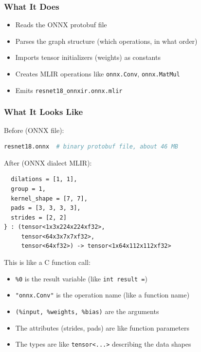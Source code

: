 \documentclass[12pt,a4paper]{article}
\begin{document}
\subsubsection{What It Does}
\begin{itemize}
  \item Reads the ONNX protobuf file
  \item Parses the graph structure (which operations, in what order)
  \item Imports tensor initializers (weights) as constants
  \item Creates MLIR operations like \texttt{onnx.Conv}, \texttt{onnx.MatMul}
  \item Emits \texttt{resnet18\_onnxir.onnx.mlir}
\end{itemize}

\subsubsection{What It Looks Like}
Before (ONNX file):
\begin{lstlisting}[language=bash]
resnet18.onnx  # binary protobuf file, about 46 MB
\end{lstlisting}

After (ONNX dialect MLIR):
\begin{lstlisting}[caption=Stage 1 Output Example]
%0 = "onnx.Conv"(%input, %weights, %bias) {
  dilations = [1, 1],
  group = 1,
  kernel_shape = [7, 7],
  pads = [3, 3, 3, 3],
  strides = [2, 2]
} : (tensor<1x3x224x224xf32>,
     tensor<64x3x7x7xf32>,
     tensor<64xf32>) -> tensor<1x64x112x112xf32>
\end{lstlisting}

\begin{analogyenv}
This is like a C function call:
\begin{itemize}
  \item \texttt{\%0} is the result variable (like \texttt{int result =})
  \item \texttt{"onnx.Conv"} is the operation name (like a function name)
  \item \texttt{(\%input, \%weights, \%bias)} are the arguments
  \item The attributes (strides, pads) are like function parameters
  \item The types are like \texttt{tensor<...>} describing the data shapes
\end{itemize}
\end{analogyenv}
\end{document}
